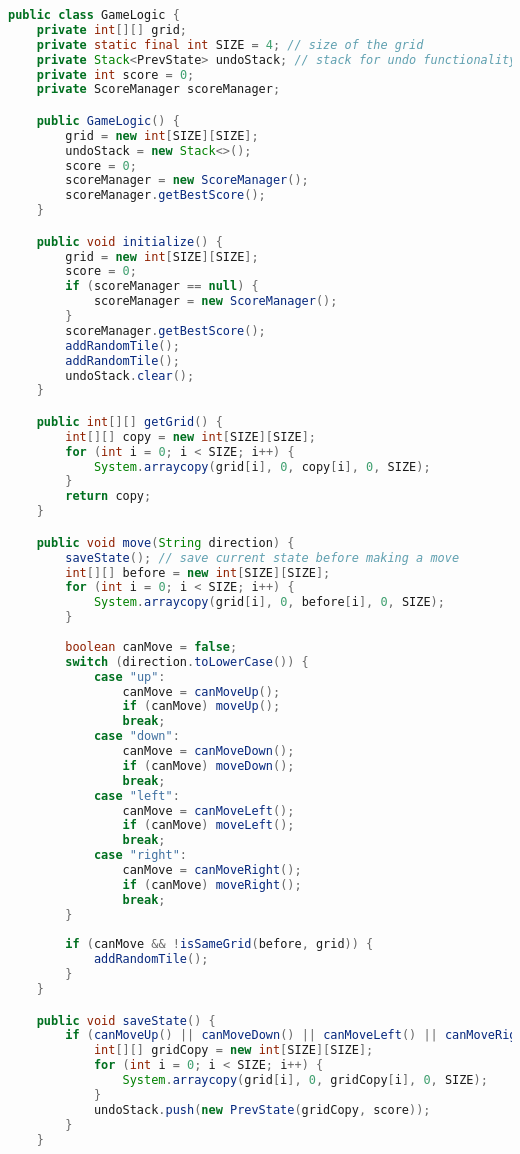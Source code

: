 \documentclass[12pt, a4paper]{article}
\begin{document}
\begin{lstlisting}[language=Java, caption=GameLogic Class Implementation]
public class GameLogic {
    private int[][] grid;
    private static final int SIZE = 4; // size of the grid
    private Stack<PrevState> undoStack; // stack for undo functionality
    private int score = 0;
    private ScoreManager scoreManager;

    public GameLogic() {
        grid = new int[SIZE][SIZE];
        undoStack = new Stack<>();
        score = 0;
        scoreManager = new ScoreManager();
        scoreManager.getBestScore();
    }

    public void initialize() {
        grid = new int[SIZE][SIZE];
        score = 0;
        if (scoreManager == null) {
            scoreManager = new ScoreManager();
        }
        scoreManager.getBestScore();
        addRandomTile();
        addRandomTile();
        undoStack.clear();
    }

    public int[][] getGrid() {
        int[][] copy = new int[SIZE][SIZE];
        for (int i = 0; i < SIZE; i++) {
            System.arraycopy(grid[i], 0, copy[i], 0, SIZE);
        }
        return copy;
    }

    public void move(String direction) {
        saveState(); // save current state before making a move
        int[][] before = new int[SIZE][SIZE];
        for (int i = 0; i < SIZE; i++) {
            System.arraycopy(grid[i], 0, before[i], 0, SIZE);
        }
        
        boolean canMove = false;
        switch (direction.toLowerCase()) {
            case "up":
                canMove = canMoveUp();
                if (canMove) moveUp();
                break;
            case "down":
                canMove = canMoveDown();
                if (canMove) moveDown();
                break;
            case "left":
                canMove = canMoveLeft();
                if (canMove) moveLeft();
                break;
            case "right":
                canMove = canMoveRight();
                if (canMove) moveRight();
                break;
        }
        
        if (canMove && !isSameGrid(before, grid)) {
            addRandomTile();
        }
    }

    public void saveState() {
        if (canMoveUp() || canMoveDown() || canMoveLeft() || canMoveRight()) {
            int[][] gridCopy = new int[SIZE][SIZE];
            for (int i = 0; i < SIZE; i++) {
                System.arraycopy(grid[i], 0, gridCopy[i], 0, SIZE);
            }
            undoStack.push(new PrevState(gridCopy, score));
        }
    }


\end{lstlisting}
\end{document}
